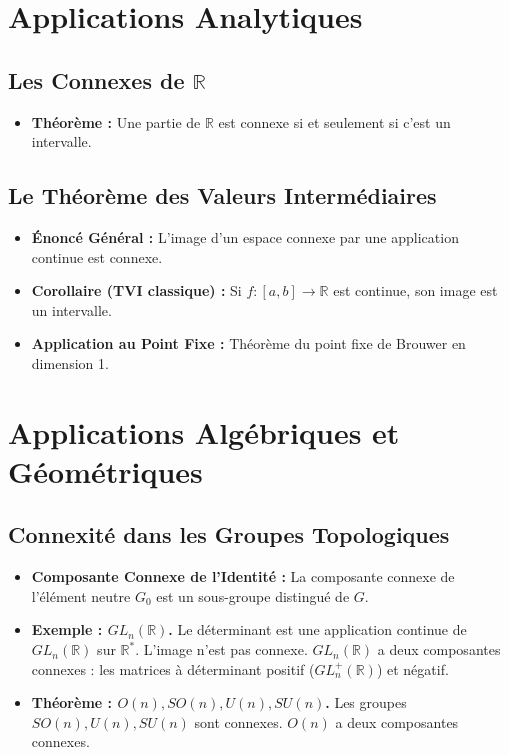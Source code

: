 \documentclass[12pt, a4paper, parskip=full]{report}
\theoremstyle{agregstyle}
\begin{document}
\section{Applications Analytiques}

\subsection{Les Connexes de $\mathbb{R}$}
\begin{itemize}
    \item \textbf{Théorème :} Une partie de $\mathbb{R}$ est connexe si et seulement si c'est un intervalle.
\end{itemize}

\subsection{Le Théorème des Valeurs Intermédiaires}
\begin{itemize}
    \item \textbf{Énoncé Général :} L'image d'un espace connexe par une application continue est connexe.
    \item \textbf{Corollaire (TVI classique) :} Si $f: [a,b] \to \mathbb{R}$ est continue, son image est un intervalle.
    \item \textbf{Application au Point Fixe :} Théorème du point fixe de Brouwer en dimension 1.
\end{itemize}

\section{Applications Algébriques et Géométriques}

\subsection{Connexité dans les Groupes Topologiques}
\begin{itemize}
    \item \textbf{Composante Connexe de l'Identité :} La composante connexe de l'élément neutre $G_0$ est un sous-groupe distingué de $G$.
    \item \textbf{Exemple : $GL_n(\mathbb{R})$.} Le déterminant est une application continue de $GL_n(\mathbb{R})$ sur $\mathbb{R}^*$. L'image n'est pas connexe. $GL_n(\mathbb{R})$ a deux composantes connexes : les matrices à déterminant positif ($GL_n^+(\mathbb{R})$) et négatif.
    \item \textbf{Théorème : $O(n), SO(n), U(n), SU(n)$.} Les groupes $SO(n), U(n), SU(n)$ sont connexes. $O(n)$ a deux composantes connexes.
\end{itemize}
\end{document}

